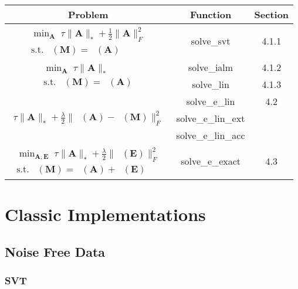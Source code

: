 \documentclass{article}
\DeclareMathOperator*{\pro}{\mathcal P_{\Omega}}
\begin{document}
\begin{table}[!h]
{\small{
\centering

\begin{tabular}{c | c | c}
\hline
Problem & Function & Section \\
\hline

$\begin{array}{c} \min_{\mathbf A} \; \tau \| \mathbf A \|_* +  \frac{1}{2} \| \mathbf{ A } \|_F^2 \\
\text{s.t.} \; \pro (\mathbf M) = \pro (\mathbf A) \end{array}$ & solve\_svt	& 4.1.1  \\
\hline

\multirow{2}{*}{$\begin{array}{c} \min_{\mathbf A} \; \tau \| \mathbf A \|_* \\
\text{s.t.} \; \pro (\mathbf M) = \pro (\mathbf A) \end{array}$} & solve\_ialm	& 4.1.2 \\
		& solve\_lin	& 4.1.3 \\
		
\hline
\multirow{3}{*}{$\begin{array}{c} \tau \| \mathbf A \|_*  +  \frac{\lambda}{2} \| \mathbf{ \pro (A) - \pro (M)  } \|^2_F  \end{array}$}
	& solve\_e\_lin & 4.2 \\
	& solve\_e\_lin\_ext & \\
	& solve\_e\_lin\_acc & \\
\hline

$\begin{array}{c} \min_{\mathbf{A,E}} \; \tau \| \mathbf A \|_* + \frac{\lambda}{2} \| \pro (\mathbf E) \|_F^2\\
\text{s.t.} \; \pro (\mathbf M) = \pro (\mathbf A) + \pro (\mathbf E) \end{array}$ & solve\_e\_exact	& 4.3  \\
\hline

\end{tabular}
}}
\end{table}

\newpage
\section{Classic Implementations}
\subsection{Noise Free Data}
\subsubsection{SVT}
\end{document}
